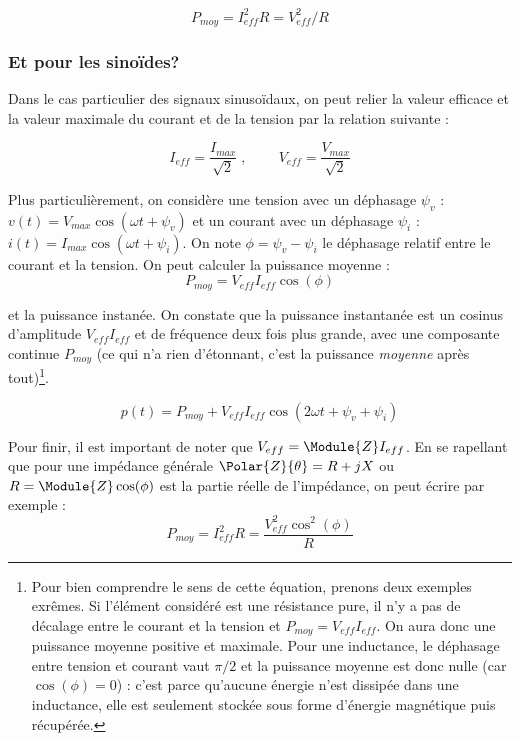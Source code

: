 \begin{equation}
P_{moy} = I_{eff}^2 R = V_{eff}^2/R
\end{equation}

\subsubsection*{Et pour les sinoïdes?}
Dans le cas particulier des signaux sinusoïdaux, on peut relier la valeur efficace et la valeur maximale du courant et de la tension par la relation suivante :

\begin{equation}
I_{eff} = \frac{I_{max}}{\sqrt{2}} \;, \; \;  \; \; \; \; \; \; V_{eff} = \frac{V_{max}}{\sqrt{2}}
\end{equation}

Plus particulièrement, on considère une tension avec un déphasage $\psi_v$ : $v(t) = V_{max}\cos(\omega t + \psi_v)$ et un courant  avec un déphasage $\psi_i$ : $i(t) = I_{max}\cos(\omega t + \psi_i)$. On note $\phi = \psi_v - \psi_i$ le déphasage relatif entre le courant et la tension. On peut calculer la puissance moyenne :
\begin{equation}
P_{moy} = V_{eff}I_{eff}\cos(\phi)
\end{equation}

et la puissance instanée. On constate que la puissance instantanée est un cosinus d'amplitude $V_{eff}I_{eff}$ et de fréquence deux fois plus grande, avec une composante continue $P_{moy}$ (ce qui n'a rien d'étonnant, c'est la puissance \textit{moyenne} après tout)\footnote{Pour bien comprendre le sens de cette équation, prenons deux exemples exrêmes. Si l'élément considéré est une résistance pure, il n'y a pas de décalage entre le courant et la tension et $P_{moy} = V_{eff}I_{eff}$. On aura donc une puissance moyenne positive et maximale. Pour une inductance, le déphasage entre tension et courant vaut $\pi/2$ et la puissance moyenne est donc nulle (car $\cos(\phi) = 0$) : c'est parce qu'aucune énergie n'est dissipée dans une inductance, elle est seulement stockée sous forme d'énergie magnétique puis récupérée.}.

\begin{equation}
p(t) = P_{moy} + V_{eff}I_{eff}\cos(2 \omega t + \psi_v + \psi_i)
\end{equation}


Pour finir, il est important de noter que $V_{eff} = \Module{Z} I_{eff}$. En se rapellant que pour une impédance générale $\Polar{Z}{\theta} = R + jX$ ou $R = \Module{Z}\cos(\phi)$ est la partie réelle de l'impédance, on peut écrire par exemple :
\begin{equation}
P_{moy} = I_{eff}^2R = \frac{V_{eff}^2\cos^2(\phi)}{R}
\end{equation}

